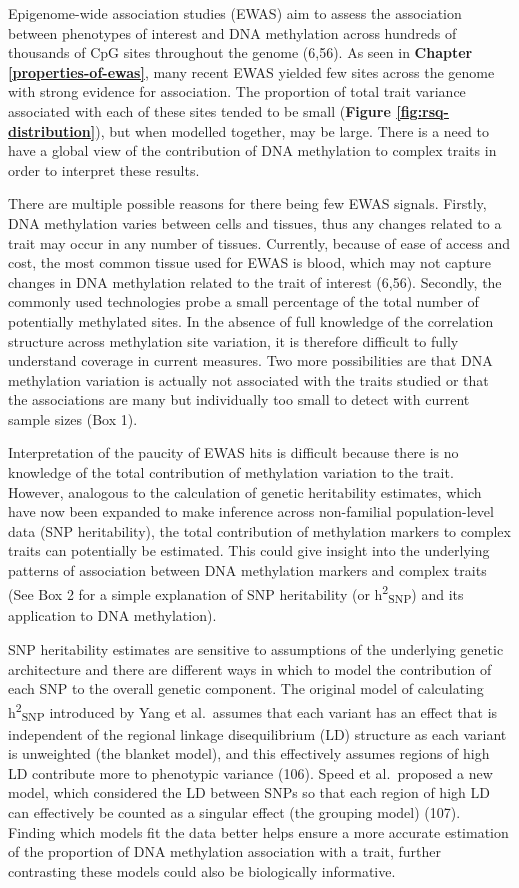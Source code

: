 \documentclass[11pt,oneside]{bristolthesis}
\begin{document}
Epigenome-wide association studies (EWAS) aim to assess the association between phenotypes of interest and DNA methylation across hundreds of thousands of CpG sites throughout the genome (6,56). As seen in \textbf{Chapter \ref{properties-of-ewas}}, many recent EWAS yielded few sites across the genome with strong evidence for association. The proportion of total trait variance associated with each of these sites tended to be small (\textbf{Figure \ref{fig:rsq-distribution}}), but when modelled together, may be large. There is a need to have a global view of the contribution of DNA methylation to complex traits in order to interpret these results.

There are multiple possible reasons for there being few EWAS signals. Firstly, DNA methylation varies between cells and tissues, thus any changes related to a trait may occur in any number of tissues. Currently, because of ease of access and cost, the most common tissue used for EWAS is blood, which may not capture changes in DNA methylation related to the trait of interest (6,56). Secondly, the commonly used technologies probe a small percentage of the total number of potentially methylated sites. In the absence of full knowledge of the correlation structure across methylation site variation, it is therefore difficult to fully understand coverage in current measures. Two more possibilities are that DNA methylation variation is actually not associated with the traits studied or that the associations are many but individually too small to detect with current sample sizes (Box 1).

Interpretation of the paucity of EWAS hits is difficult because there is no knowledge of the total contribution of methylation variation to the trait. However, analogous to the calculation of genetic heritability estimates, which have now been expanded to make inference across non-familial population-level data (SNP heritability), the total contribution of methylation markers to complex traits can potentially be estimated. This could give insight into the underlying patterns of association between DNA methylation markers and complex traits (See Box 2 for a simple explanation of SNP heritability (or h\textsuperscript{2}\textsubscript{SNP}) and its application to DNA methylation).

SNP heritability estimates are sensitive to assumptions of the underlying genetic architecture and there are different ways in which to model the contribution of each SNP to the overall genetic component. The original model of calculating h\textsuperscript{2}\textsubscript{SNP} introduced by Yang et al.~assumes that each variant has an effect that is independent of the regional linkage disequilibrium (LD) structure as each variant is unweighted (the blanket model), and this effectively assumes regions of high LD contribute more to phenotypic variance (106). Speed et al.~proposed a new model, which considered the LD between SNPs so that each region of high LD can effectively be counted as a singular effect (the grouping model) (107). Finding which models fit the data better helps ensure a more accurate estimation of the proportion of DNA methylation association with a trait, further contrasting these models could also be biologically informative.
\end{document}

